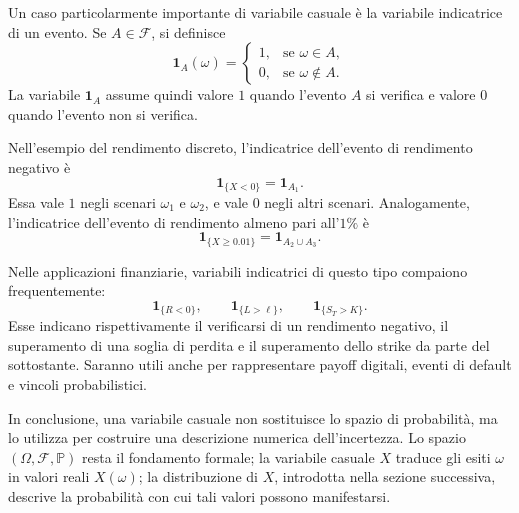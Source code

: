 Un caso particolarmente importante di variabile casuale \`{e} la variabile
indicatrice di un evento. Se $A\in\mathcal{F}$, si definisce
\[
\mathbf{1}_{A}(\omega)=
\begin{cases}
1, & \mbox{se }\omega\in A,\\
0, & \mbox{se }\omega\notin A.
\end{cases}
\]
La variabile $\mathbf{1}_{A}$ assume quindi valore $1$ quando l'evento $A$ si
verifica e valore $0$ quando l'evento non si verifica.

Nell'esempio del rendimento discreto, l'indicatrice dell'evento di rendimento
negativo \`{e}
\[
\mathbf{1}_{\{X<0\}}=\mathbf{1}_{A_{1}}.
\]
Essa vale $1$ negli scenari $\omega_{1}$ e $\omega_{2}$, e vale $0$ negli
altri scenari. Analogamente, l'indicatrice dell'evento di rendimento almeno
pari all'$1\%$ \`{e}
\[
\mathbf{1}_{\{X\geq0.01\}}=\mathbf{1}_{A_{2}\cup A_{3}}.
\]


Nelle applicazioni finanziarie, variabili indicatrici di questo tipo compaiono
frequentemente:
\[
\mathbf{1}_{\{R<0\}}, \qquad\mathbf{1}_{\{L>\ell\}}, \qquad\mathbf{1}%
_{\{S_{T}>K\}}.
\]
Esse indicano rispettivamente il verificarsi di un rendimento negativo, il
superamento di una soglia di perdita e il superamento dello strike da parte
del sottostante. Saranno utili anche per rappresentare payoff digitali, eventi
di default e vincoli probabilistici.

In conclusione, una variabile casuale non sostituisce lo spazio di
probabilit\`{a}, ma lo utilizza per costruire una descrizione numerica
dell'incertezza. Lo spazio $(\Omega,\mathcal{F},\mathbb{P})$ resta il
fondamento formale; la variabile casuale $X$ traduce gli esiti $\omega$ in
valori reali $X(\omega)$; la distribuzione di $X$, introdotta nella sezione
successiva, descrive la probabilit\`{a} con cui tali valori possono manifestarsi.